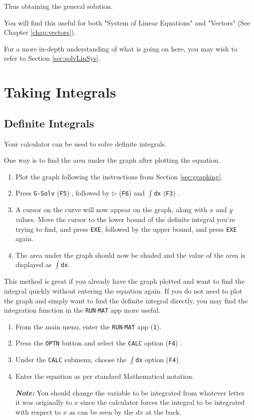 \documentclass[a5paper]{memoir}
\def\code#1{\texttt{#1}}
\def\note#1{\textcolor[HTML]{109fa9}{\textbf{\textit{Note:}}} #1}
\def\runmat{\code{RUN$\cdot$MAT} }
\def\Fthree{(\code{F3}) }
\def\Ffour{(\code{F4}) }
\def\Ffive{(\code{F5}) }
\def\Fsix{(\code{F6}) }
\begin{document}
\begin{itemize}
	Thus obtaining the general solution. 
\end{itemize}

You will find this useful for both "System of Linear Equations" and "Vectors" (See Chapter \ref{chap:vectors}). 

For a more in-depth understanding of what is going on here, you may wish to refer to Section \ref{sec:solvLinSys}.

\section{Taking Integrals}
\subsection{Definite Integrals}
Your calculator can be used to solve definite integrals.

One way is to find the area under the graph after plotting the equation.

\begin{enumerate}
	\item Plot the graph following the instructions from Section \ref{sec:graphing}.
	\item Press \code{G-Solv} \Ffive, followed by $\triangleright$ \Fsix and \code{$\int$dx} \Fthree.
	\item A cursor on the curve will now appear on the graph, along with $x$ and $y$ values. Move the cursor to the lower bound of the definite integral you're trying to find, and press \code{EXE}, followed by the upper bound, and press \code{EXE} again.
	\item The area under the graph should now be shaded and the value of the area is displayed as \code{$\int$dx}.
\end{enumerate}

This method is great if you already have the graph plotted and want to find the integral quickly without entering the equation again. If you do not need to plot the graph and simply want to find the definite integral directly, you may find the integration function in the \runmat app more useful.

\begin{enumerate}
	\item From the main menu, enter the \runmat app (\code{1}).
	\item Press the \code{OPTN} button and select the \code{CALC} option \Ffour.
	\item Under the \code{CALC} submenu, choose the \code{$\int$dx} option (\code{F4}).
	\item Enter the equation as per standard Mathematical notation. 
	
	\note{You should change the variable to be integrated from whatever letter it was originally to $x$ since the calculator forces the integral to be integrated with respect to $x$ as can be seen by the $dx$ at the back.}
\end{enumerate}
\end{document}
